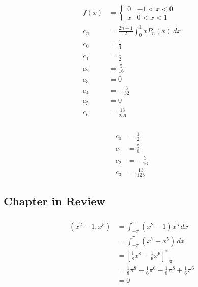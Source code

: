 \documentclass{article}
\begin{document}
\begin{align*}
  f(x) & = \begin{cases}
             0 & -1 < x < 0 \\
             x & 0 < x < 1
           \end{cases}                            \\
  c_n  & = \frac{2 n + 1}{2} \int_0^1 x P_n(x) \,d x \\
  c_0  & = \frac{1}{4}                               \\
  c_1  & = \frac{1}{2}                               \\
  c_2  & = \frac{5}{16}                              \\
  c_3  & = 0                                         \\
  c_4  & = -\frac{3}{32}                             \\
  c_5  & = 0                                         \\
  c_6  & = \frac{13}{256}
\end{align*}

\setcounter{subsubsection}{20}
\subsubsection{}

\begin{align*}
  c_0 & = \frac{1}{2}    \\
  c_1 & = \frac{5}{8}    \\
  c_2 & = -\frac{3}{16}  \\
  c_3 & = \frac{13}{128}
\end{align*}

\subsection{Chapter in Review}

\subsubsection{}

\begin{align*}
  (x^2 - 1, x^5) & = \int_{-\pi}^\pi (x^2 - 1) x^5 \,d x                                           \\
                 & = \int_{-\pi}^\pi (x^7 - x^5) \,d x                                             \\
                 & = \left[ \frac{1}{8} x^8 - \frac{1}{6} x^6 \right]_{-\pi}^\pi                   \\
                 & = \frac{1}{8} \pi^8 - \frac{1}{6} \pi^6 - \frac{1}{8} \pi^8 + \frac{1}{6} \pi^6 \\
                 & = 0
\end{align*}
\end{document}
